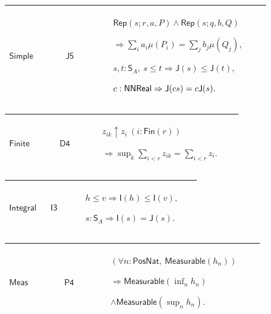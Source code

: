\documentclass[12pt,reqno]{amsart}
\theoremstyle{blueplain}
\numberwithin{equation}{section}
\begin{document}
{\scriptsize \setlength{\parskip}{0pt}\nointerlineskip
\noindent 
\begin{tabular}{|@{}>{\centering\arraybackslash}m{0.19251\linewidth}|>{\centering\arraybackslash}m{0.16845\linewidth}|>{\centering\arraybackslash}m{0.53904\linewidth}|}
\hline
\hypertarget{lem:Simple}{$\displaystyle \mathsf{Simple}$} & \hyperlink{proof:J5}%
{$\displaystyle \mathsf{J5}$} & $\displaystyle \mathsf{Rep}(s;r,a,P)\land%
\mathsf{Rep}(s;q,b,Q)$\par$\displaystyle \Rightarrow\sum_i
a_i\mu(P_i)=\sum_j b_j\mu(Q_j),$\par$\displaystyle s,t:\mathsf{S}_A,\ s\le
t\Rightarrow\mathsf{J}(s)\le\mathsf{J}(t),$\par$\displaystyle c:\mathsf{%
NNReal}\Rightarrow\mathsf{J}(cs)=c\mathsf{J}(s).$ \\ \hline
\end{tabular}%
}

{\scriptsize \setlength{\parskip}{0pt}\nointerlineskip
\noindent 
\begin{tabular}{|@{}>{\centering\arraybackslash}m{0.19251\linewidth}|>{\centering\arraybackslash}m{0.16845\linewidth}|>{\centering\arraybackslash}m{0.53904\linewidth}|}
\hline
\hypertarget{lem:Finite}{$\displaystyle \mathsf{Finite}$} & \hyperlink{proof:D4}%
{$\displaystyle \mathsf{D4}$} & $\displaystyle z_{ik}\uparrow z_i\ (i:%
\mathsf{Fin}(r))$\par$\displaystyle \Rightarrow\sup_k\sum_{i<r}z_{ik}=%
\sum_{i<r}z_i.$ \\ \hline
\end{tabular}%
}

{\scriptsize \setlength{\parskip}{0pt}\nointerlineskip
\noindent 
\begin{tabular}{|@{}>{\centering\arraybackslash}m{0.19251\linewidth}|>{\centering\arraybackslash}m{0.16845\linewidth}|>{\centering\arraybackslash}m{0.53904\linewidth}|}
\hline
\hypertarget{lem:Integral}{$\displaystyle \mathsf{Integral}$} & \hyperlink{proof:I3}%
{$\displaystyle \mathsf{I3}$} & $\displaystyle h\le v\Rightarrow\mathsf{I}%
(h)\le\mathsf{I}(v),$\par$\displaystyle s:\mathsf{S}_A\Rightarrow\mathsf{I}%
(s)=\mathsf{J}(s).$ \\ \hline
\end{tabular}%
}

{\scriptsize \setlength{\parskip}{0pt}\nointerlineskip
\noindent 
\begin{tabular}{|@{}>{\centering\arraybackslash}m{0.19251\linewidth}|>{\centering\arraybackslash}m{0.16845\linewidth}|>{\centering\arraybackslash}m{0.53904\linewidth}|}
\hline
\hypertarget{lem:Meas}{$\displaystyle \mathsf{Meas}$} & \hyperlink{proof:P4}{%
$\displaystyle \mathsf{P4}$} & $\displaystyle (\forall n:\mathsf{PosNat},\ 
\mathsf{Measurable}(h_n))$\par$\displaystyle \Rightarrow\mathsf{Measurable}%
(\inf_n h_n)$\par$\displaystyle \land\mathsf{Measurable}(\sup_n h_n).$ \\ 
\hline
\end{tabular}%
}
\end{document}
